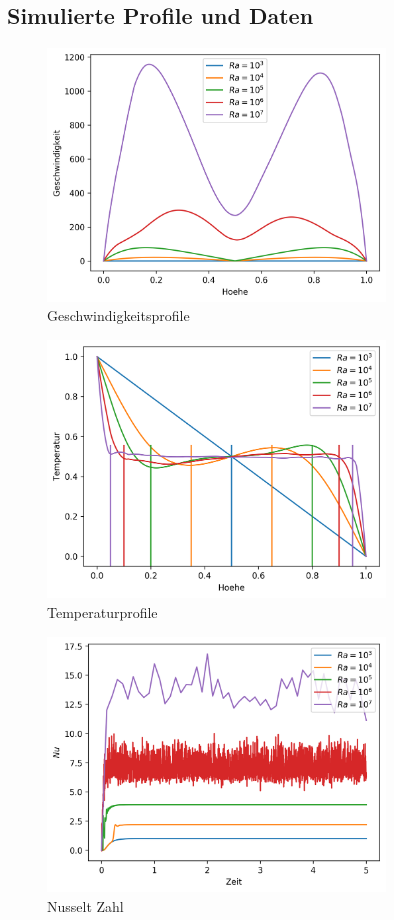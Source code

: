 \documentclass[12pt,a4paper,titlepage,headinclude]{scrartcl}
\numberwithin{equation}{subsection}
\begin{document}
\subsection{Simulierte Profile und Daten}
\begin{figure}[!ht]
\centering
\includegraphics[width=0.8\textwidth]{V.png}
\caption{Geschwindigkeitsprofile}
\label{fig:v_num}
\end{figure}

\begin{figure}[!ht]
\centering
\includegraphics[width=0.8\textwidth]{T.png}
\caption{Temperaturprofile}
\label{fig:t_num}
\end{figure}

\begin{figure}[!ht]
\centering
\includegraphics[width=0.8\textwidth]{Nu.png}
\caption{Nusselt Zahl}
\label{fig:nu_num}
\end{figure}
\end{document}
